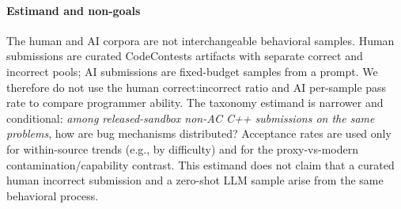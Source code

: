\documentclass[conference]{IEEEtran}
\begin{document}
\paragraph{Estimand and non-goals}
The human and AI corpora are not interchangeable behavioral samples. Human
submissions are curated CodeContests artifacts with separate correct and incorrect
pools; AI submissions are fixed-budget samples from a prompt. We therefore do not use
the human correct:incorrect ratio and AI per-sample pass rate to compare programmer
ability. The taxonomy estimand is narrower and conditional: \emph{among
released-sandbox non-AC C++ submissions on the same problems}, how are bug
mechanisms distributed? Acceptance rates are used only for within-source trends
(e.g., by difficulty) and for the proxy-vs-modern contamination/capability contrast.
This estimand does not claim that a curated human incorrect submission and a zero-shot
LLM sample arise from the same behavioral process.
\end{document}
